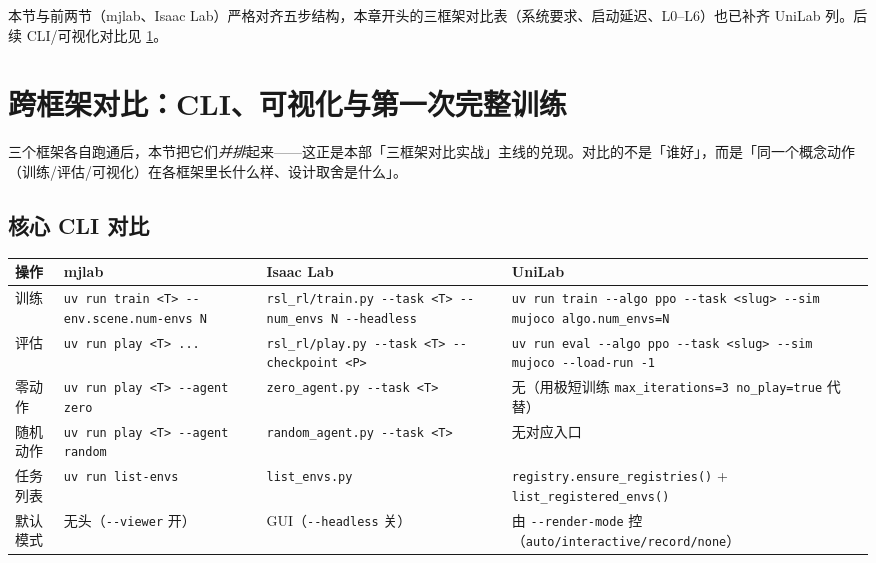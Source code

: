 \begin{note}[结构对齐]
本节与前两节（mjlab、Isaac Lab）严格对齐五步结构，本章开头的三框架对比表（系统要求、启动延迟、L0--L6）也已补齐 UniLab 列。后续 CLI/可视化对比见 \cref{sec:rlmc-setup-compare}。
\end{note}

\section{跨框架对比：CLI、可视化与第一次完整训练}
\label{sec:rlmc-setup-compare}

三个框架各自跑通后，本节把它们\emph{并排}起来——这正是本部「三框架对比实战」主线的兑现。对比的不是「谁好」，而是「同一个概念动作（训练/评估/可视化）在各框架里长什么样、设计取舍是什么」。

\subsection{核心 CLI 对比}

\begin{center}
\scriptsize
\begin{tabular}{@{}p{1.4cm}p{3.7cm}p{3.7cm}p{4.0cm}@{}}
\toprule
操作 & mjlab & Isaac Lab & UniLab \\
\midrule
训练 & \verb|uv run train <T> --env.scene.num-envs N| & \verb|rsl_rl/train.py --task <T> --num_envs N --headless| & \verb|uv run train --algo ppo --task <slug> --sim mujoco algo.num_envs=N| \\
评估 & \verb|uv run play <T> ...| & \verb|rsl_rl/play.py --task <T> --checkpoint <P>| & \verb|uv run eval --algo ppo --task <slug> --sim mujoco --load-run -1| \\
零动作 & \verb|uv run play <T> --agent zero| & \verb|zero_agent.py --task <T>| & 无（用极短训练 \verb|max_iterations=3 no_play=true| 代替） \\
随机动作 & \verb|uv run play <T> --agent random| & \verb|random_agent.py --task <T>| & 无对应入口 \\
任务列表 & \verb|uv run list-envs| & \verb|list_envs.py| & \verb|registry.ensure_registries()| + \verb|list_registered_envs()| \\
默认模式 & 无头（\verb|--viewer| 开） & GUI（\verb|--headless| 关） & 由 \verb|--render-mode| 控（\verb|auto/interactive/record/none|） \\
\bottomrule
\end{tabular}
\end{center}

